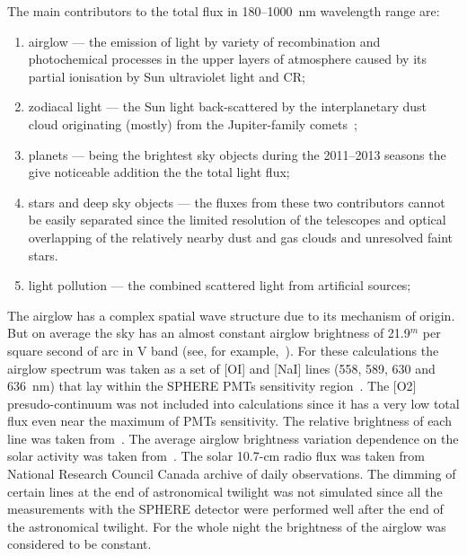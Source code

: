 \documentclass[final,5p,times,twocolumn]{elsarticle}
\begin{document}
The main contributors to the total flux in 180--1000~nm wavelength range are:
\begin{enumerate}
    \item airglow --- the emission of light by variety of recombination and photochemical processes in the upper layers of atmosphere caused by its partial ionisation by Sun ultraviolet light and CR;
    \item zodiacal light --- the Sun light back-scattered by the interplanetary dust cloud originating (mostly) from the Jupiter-family comets~\cite{Nesvorn__2010};
    \item planets --- being the brightest sky objects during the 2011--2013 seasons the give noticeable addition the the total light flux;
    \item stars and deep sky objects --- the fluxes from these two contributors cannot be easily separated since the limited resolution of the telescopes and optical overlapping of the relatively nearby dust and gas clouds and unresolved faint stars.
    \item light pollution --- the combined scattered light from artificial sources;
\end{enumerate}

The airglow has a complex spatial wave structure due to its mechanism of origin. But on average the sky has an almost constant airglow brightness of 21.9$^m$ per square second of arc in V band (see, for example,~\cite{BENN1998503}). For these calculations the airglow spectrum was taken as a set of [OI] and [NaI] lines (558, 589, 630 and 636~nm) that lay within the SPHERE PMTs sensitivity region~\cite{Ant16}. The [O2] presudo-continuum was not included into calculations since it has a very low total flux even near the maximum of PMTs sensitivity. The relative brightness of each line was taken from~\cite{KRASSOVSKY1962883}. The average airglow brightness variation dependence on the solar activity was taken from~\cite{BENN1998503}. The solar 10.7-cm radio flux was taken from National Research Council Canada archive of daily observations. The dimming of certain lines at the end of astronomical twilight was not simulated since all the measurements with the SPHERE detector were performed well after the end of the astronomical twilight. For the whole night the brightness of the airglow was considered to be constant.
\end{document}
